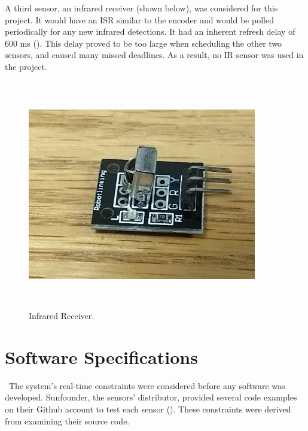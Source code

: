 \documentclass[letterpaper, 12pt]{article}
\begin{document}
A third sensor, an infrared receiver (shown below), was considered for this project. It would have an ISR similar to the encoder and would be polled periodically for any new infrared detections. It had an inherent refresh delay of 600 ms (\cite{sunfounder2018}).  This delay proved to be too large when scheduling the other two sensors, and caused many missed deadlines.  As a result, no IR sensor was used in the project.
~\newline 
\begin{figure}[H]
	\centering
	\includegraphics[width=10cm,height=10cm,keepaspectratio]{infrared.jpg}
	\caption[Sensor3]{Infrared Receiver.}
	\label{fig:infrared}
\end{figure}

\section{Software Specifications}
~\indent The system's real-time constraints were considered before any software was developed.  Sunfounder, the sensors' distributor, provided several code examples on their Github account to test each sensor (\cite{sunfounder2018}).  These constraints were derived from examining their source code.
  
\end{document}
